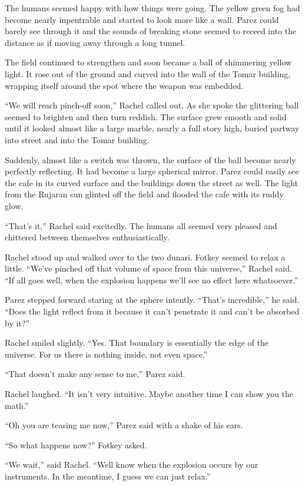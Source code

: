 The humans seemed happy with how things were going. The yellow green fog had become nearly
inpentrable and started to look more like a wall. Parez could barely see through it and the
sounds of breaking stone seemed to receed into the distance as if moving away through a long
tunnel.

The field continued to strengthen and soon became a ball of shimmering yellow light. It rose out
of the ground and curved into the wall of the Tomar building, wrapping itself around the spot
where the weapon was embedded.

``We will reach pinch-off soon,'' Rachel called out. As she spoke the glittering ball seemed to
brighten and then turn reddish. The surface grew smooth and solid until it looked almost like a
large marble, nearly a full story high, buried partway into street and into the Tomar building.

Suddenly, almost like a switch was thrown, the surface of the ball become nearly perfectly
reflecting. It had become a large spherical mirror. Parez could easily see the cafe in its
curved surface and the buildings down the street as well. The light from the Rujaran sun
glinted off the field and flooded the cafe with its ruddy glow.

``That's it,'' Rachel said excitedly. The humans all seemed very pleased and chittered between
themselves enthusiastically.

Rachel stood up and walked over to the two dunari. Fotkey seemed to relax a little. ``We've
pinched off that volume of space from this universe,'' Rachel said. ``If all goes well, when the
explosion happens we'll see no effect here whatsoever.''

Parez stepped forward staring at the sphere intently. ``That's incredible,'' he said. ``Does the
light reflect from it because it can't penetrate it and can't be absorbed by it?''

Rachel smiled slightly. ``Yes. That boundary is essentially the edge of the universe. For us
there is nothing inside, not even space.''

``That doesn't make any sense to me,'' Parez said.

Rachel laughed. ``It isn't very intuitive. Maybe another time I can show you the math.''

``Oh you are teasing me now,'' Parez said with a shake of his ears.

``So what happens now?'' Fotkey asked.

``We wait,'' said Rachel. ``Well know when the explosion occurs by our instruments. In the
meantime, I guess we can just relax.''
